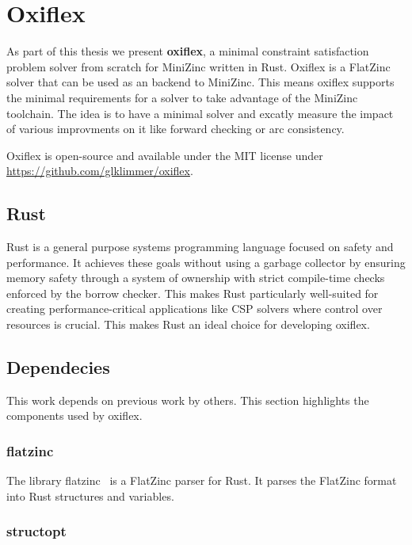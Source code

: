\chapter{Oxiflex}

As part of this thesis we present \textbf{oxiflex}, a minimal constraint satisfaction problem solver from scratch for MiniZinc written in Rust. Oxiflex is a FlatZinc solver that can be used as an backend to MiniZinc. This means oxiflex supports the minimal requirements for a solver to take advantage of the MiniZinc toolchain. The idea is to have a minimal solver and excatly measure the impact of various improvments on it like forward checking or arc consistency.

Oxiflex is open-source and available under the MIT license under \url{https://github.com/glklimmer/oxiflex}.

\section{Rust}

Rust is a general purpose systems programming language focused on safety and performance. It achieves these goals without using a garbage collector by ensuring memory safety through a system of ownership with strict compile-time checks enforced by the borrow checker. This makes Rust particularly well-suited for creating performance-critical applications like CSP solvers where control over resources is crucial. This makes Rust an ideal choice for developing oxiflex.

\section{Dependecies}

This work depends on previous work by others. This section highlights the components used by oxiflex.

\subsection{flatzinc} \label{flatzinc}

The library flatzinc~\cite{flatzinc:2020} is a FlatZinc parser for Rust. It parses the FlatZinc format into Rust structures and variables.

\subsection{structopt}

